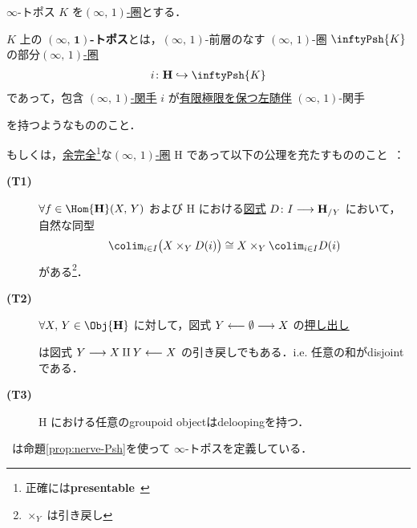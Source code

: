 \documentclass[TQFT_main]{subfiles}
\begin{document}
\begin{mydef}[label=def:infinity-topos]{$\infty$-トポス}
    $K$ を\hyperref[def:infinity-1]{$(\infty,\, 1)$-圏}とする．
    
    $K$ 上の $\bm{(\infty,\, 1)}$\textbf{-トポス}とは，$(\infty,\, 1)$-前層のなす $(\infty,\, 1)$-圏 $\inftyPsh{K}$ の部分\hyperref[def:infinity-1]{$(\infty,\, 1)$-圏}
    \begin{align}
        i \colon \bm{\mathrm{H}} \hookrightarrow \inftyPsh{K}
    \end{align}
    であって，包含 \hyperref[def:infinity-1]{$(\infty,\, 1)$-関手} $i$ が\hyperref[def:colim]{有限極限を保つ}\hyperref[def:adjoint]{左随伴} $(\infty,\, 1)$-関手
    \begin{center}
    \end{center}
    を持つようなもののこと．

    \tcblower

    もしくは，\hyperref[def:complete]{余完全}\footnote{正確には\textbf{presentable}~\cite[p.372, Def5.5.0.18]{lurie2008higher}}な\hyperref[def:infinity-1]{$(\infty,\, 1)$-圏} $\bm{\mathrm{H}}$ であって以下の公理を充たすもののこと~\cite[p.9, Definition5.4]{NSS2012}：
    \begin{description}
        \item[\textbf{(T1)}] $\forall f \in \Hom{\bm{\mathrm{H}}}(X,\, Y)$ および $\bm{\mathrm{H}}$ における\hyperref[def:diagram]{図式} $D \colon I \longrightarrow \bm{\mathrm{H}}_{/Y}$ において，自然な同型
        \begin{align}
            \colim_{i \in I} \bigl( X \times_Y D(i) \bigr) \cong X \times_Y \colim_{i \in I} D(i)
        \end{align}
        がある\footnote{$\times_Y$ は引き戻し}．
        \item[\textbf{(T2)}] $\forall X,\, Y \in \Obj{\bm{\mathrm{H}}}$ に対して，図式 $Y \longleftarrow \emptyset \longrightarrow X$ の\hyperref[def:colim]{押し出し}
        \begin{center}
        \end{center}
        は図式 $Y \longrightarrow X \amalg Y \longleftarrow X$ の引き戻しでもある．i.e. 任意の和がdisjointである．
        \item[\textbf{(T3)}] $\bm{\mathrm{H}}$ における任意のgroupoid objectはdeloopingを持つ．
    \end{description}
    
\end{mydef}

~\cite{alfonsi2023higher}は命題\ref{prop:nerve-Psh}を使って $\infty$-トポスを定義している．
\end{document}
